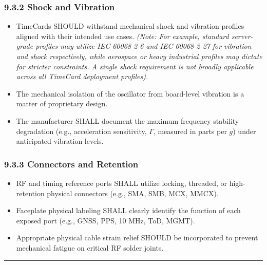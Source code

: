 \documentclass[
]{article}
\begin{document}
\subsubsection{9.3.2 Shock and Vibration}\label{shock-and-vibration}

\begin{itemize}
\item
  TimeCards SHOULD withstand mechanical shock and vibration profiles
  aligned with their intended use cases. \emph{(Note: For example,
  standard server-grade profiles may utilize IEC 60068-2-6 and IEC
  60068-2-27 for vibration and shock respectively, while aerospace or
  heavy industrial profiles may dictate far stricter constraints. A
  single shock requirement is not broadly applicable across all TimeCard
  deployment profiles).}\\
\item
  The mechanical isolation of the oscillator from board-level vibration
  is a matter of proprietary design.\\
\item
  The manufacturer SHALL document the maximum frequency stability
  degradation (e.g., acceleration sensitivity, \(\Gamma\), measured in
  parts per \(g\)) under anticipated vibration levels.
\end{itemize}

\subsubsection{9.3.3 Connectors and
Retention}\label{connectors-and-retention}

\begin{itemize}
\item
  RF and timing reference ports SHALL utilize locking, threaded, or
  high-retention physical connectors (e.g., SMA, SMB, MCX, MMCX).\\
\item
  Faceplate physical labeling SHALL clearly identify the function of
  each exposed port (e.g., GNSS, PPS, 10 MHz, ToD, MGMT).\\
\item
  Appropriate physical cable strain relief SHOULD be incorporated to
  prevent mechanical fatigue on critical RF solder joints.
\end{itemize}

\begin{center}\rule{0.5\linewidth}{0.5pt}\end{center}
\end{document}
